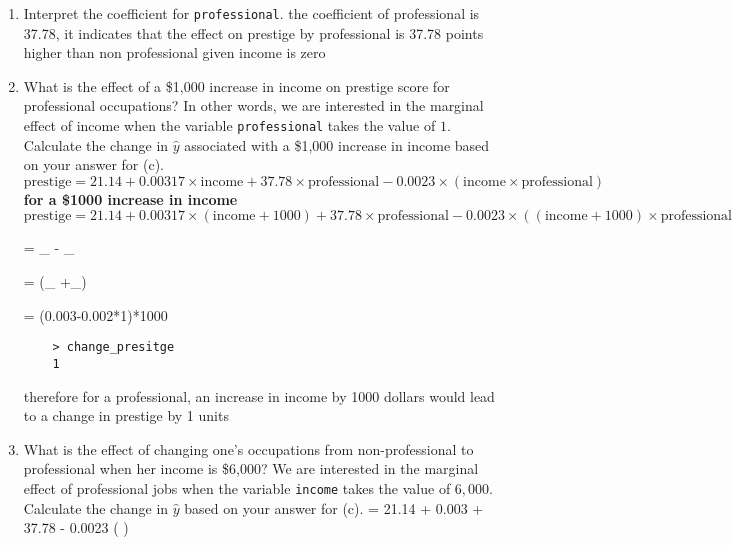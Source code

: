 \documentclass[12pt,letterpaper]{article}
\begin{document}
\begin{enumerate}
	\vspace{0.7cm}	
	\item \text{[(e)]}
	Interpret the coefficient for \texttt{professional}.
	\vspace{0.2cm}
	\newline
	the coefficient of professional is 37.78, it indicates that the effect on prestige by professional is 37.78 points higher than non professional given income is zero
	\newpage
	\item \text{[(f)]}
	What is the effect of a \$1,000 increase in income on prestige score for professional occupations? In other words, we are interested in the marginal effect of income when the variable \texttt{professional} takes the value of $1$. Calculate the change in $\hat{y}$ associated with a \$1,000 increase in income based on your answer for (c).
	\[
	\text{prestige} = 21.14 + 0.00317 \times \text{income} + 37.78 \times \text{professional} - 0.0023 \times (\text{income} \times \text{professional})
	\]
\textbf{for a \$1000 increase in income}
	\[
	\text{prestige} = 21.14 + 0.00317 \times (\text{income} + 1000) + 37.78 \times \text{professional} - 0.0023 \times ((\text{income} + 1000) \times \text{professional})
	\]
	
	\vspace{0.3cm}
	\Delta {} = _ - _{}
	
	\Delta {} = (\beta_{} +\beta_{})
	
	\Delta {} = (0.003-0.002*1)*1000 \space {}
	

\begin{BVerbatim}
	> change_presitge
	1
\end{BVerbatim}
\newline
\vspace{0.01cm}
\newline
therefore for a professional, an increase in income by 1000 dollars would lead to a change in prestige by 1 units
	
	\vspace{1cm}
	
	\item \text{[(g)]} What is the effect of changing one's occupations from non-professional to professional when her income is \$6,000? We are interested in the marginal effect of professional jobs when the variable \texttt{income} takes the value of $6,000$. Calculate the change in $\hat{y}$ based on your answer for (c).
	\vspace{0.7cm}
	\newline
	 = 21.14 + 0.003 \times {} + 37.78 \times {} - 0.0023 \times ( \times {})
	

\end{enumerate}
\end{document}
